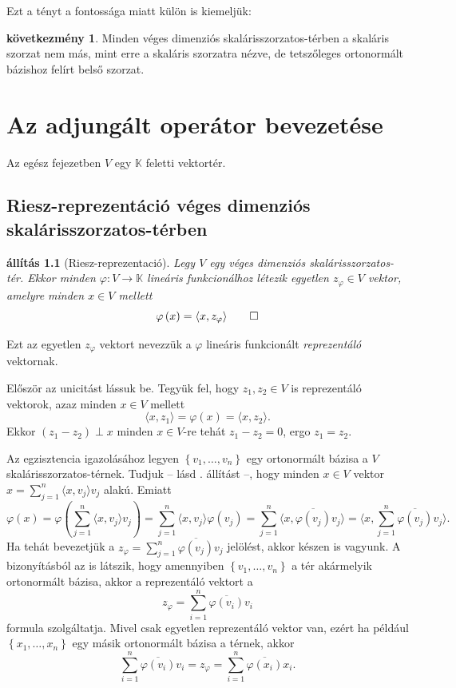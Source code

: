 \documentclass[a4paper, showtrims]{memoir}
\makeatletter
\renewenvironment{proof}[1][\proofname]
    {\par\pushQED{\qed}%
    \normalfont \topsep6\p@\@plus6\p@\relax
    \trivlist
    \item[\hskip\labelsep
        \itshape
    #1\@addpunct{:}]\ignorespaces}
    {\popQED\endtrivlist\@endpefalse}
\theoremstyle{plain}
\newtheorem{proposition}{állítás}[chapter]
\theoremstyle{remark}
\theoremstyle{definition}
\newtheorem{corollary}[proposition]{következmény}
\newcommand{\ip}[2]{\langle#1,#2\rangle}
\makeatother
\begin{document}
Ezt a tényt a fontossága miatt külön is kiemeljük:
\begin{corollary}
	Minden véges dimenziós skalárisszorzatos-térben a skaláris szorzat nem más,
	mint erre a skaláris szorzatra nézve,
	de tetszőleges ortonormált bázishoz felírt belső szorzat.
\end{corollary}

\chapter{Az adjungált operátor bevezetése}
Az egész fejezetben $V$ egy $\mathbb{K}$ feletti vektortér.
\section{Riesz-reprezentáció véges dimenziós skalárisszorzatos-térben}
\begin{proposition}[Riesz-reprezentació]\label{pr:Riesz}
	Legy $V$ egy véges dimenziós skalárisszorzatos-tér.
	Ekkor minden $\varphi:V\to\mathbb{K}$ lineáris funkcionálhoz létezik egyetlen $z_\varphi\in V$ vektor,
	amelyre minden $x\in V$ mellett
	\[
		\varphi\left( x \right)=\ip{x}{z_\varphi}
		\qedhere
	\]
\end{proposition}
Ezt az egyetlen $z_\varphi$ vektort nevezzük a $\varphi$ lineáris funkcionált \emph{reprezentáló} vektornak.
\begin{proof}
	Először az unicitást lássuk be.
	Tegyük fel, hogy $z_1,z_2\in V$ is reprezentáló vektorok,
	azaz minden $x\in V$ mellett
	\[
		\ip{x}{z_1}
		=
		\varphi\left( x \right)
		=
		\ip{x}{z_2}.
	\]
	Ekkor $(z_1-z_2)\perp x$ minden $x\in V$-re tehát $z_1-z_2=0$,
	ergo $z_1=z_2$.

	Az egzisztencia igazolásához legyen $\left\{ v_1,\ldots,v_n \right\}$ egy ortonormált bázisa a $V$ skalárisszorzatos-térnek.
    Tudjuk -- lásd . állítást --, hogy minden $x\in V$ vektor
	\begin{math}
		x=
		\sum_{j=1}^n\ip{x}{v_j}v_j
	\end{math}
	alakú.
	Emiatt
	\[
		\varphi\left( x \right)
		=
		\varphi\left(
		\sum_{j=1}^n\ip{x}{v_j}v_j
		\right)
		=
		\sum_{j=1}^n
		\ip{x}{v_j}
		\varphi\left(
		v_j
		\right)
		=
		\sum_{j=1}^n
		\ip{x}{\overline{\varphi\left(
				v_j\right)}
			v_j}
		=
		\ip{x}{
			\sum_{j=1}^n
			\overline{\varphi\left(
				v_j\right)}
			v_j}.
	\]
	Ha tehát bevezetjük a
	\begin{math}
		z_\varphi
		=
		\sum_{j=1}^n
		\overline{\varphi\left(
			v_j\right)}v_j
	\end{math}
	jelölést, akkor készen is vagyunk.
\end{proof}
A bizonyításból az is látszik, hogy amennyiben
$\left\{ v_1,\ldots,v_n \right\}$ a tér akármelyik ortonormált bázisa,
akkor a reprezentáló vektort a
\[
	z_\varphi=
	\sum_{i=1}^n\overline{\varphi\left( v_i \right)}v_i
\]
formula szolgáltatja.
Mivel csak egyetlen reprezentáló vektor van, ezért ha például
$\left\{ x_1,\ldots,x_n \right\}$ egy másik ortonormált bázisa a térnek,
akkor
\[
	\sum_{i=1}^n\overline{\varphi\left( v_i \right)}v_i
	=
	z_\varphi
	=
	\sum_{i=1}^n\overline{\varphi\left( x_i \right)}x_i.
\]
\end{document}
